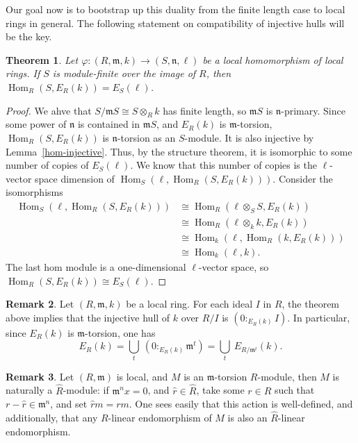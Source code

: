 \documentclass[11pt]{book}
\newtheorem{theorem}{Theorem}[chapter]
\numberwithin{equation}{section}
\numberwithin{theorem}{chapter}
\theoremstyle{definition}
\newtheorem*{basic properties}{Basic Properties}
\newtheorem*{Important Remark}{Important Remark}
\newtheorem{remark}[theorem]{Remark}
\theoremstyle{remark}
\newcommand{\m}{\mathfrak{m}}
\newcommand{\Hom}{\operatorname{Hom}}
\begin{document}
Our goal now is to bootstrap up this duality from the finite length case to local rings in general. The following statement on compatibility of injective hulls will be the key.

\begin{theorem}
	Let $\varphi \!: (R, \m, k) \longrightarrow (S, \mathfrak{n}, \ell)$ be a local homomorphism of local rings. If $S$ is module-finite over the image of $R$, then $\Hom_R(S,E_R(k)) = E_S(\ell)$.
\end{theorem}

\begin{proof} We ahve that $S/\m S \cong S \otimes_R k$ has finite length, so $\m S$ is $\mathfrak{n}$-primary. Since some power of $\mathfrak{n}$ is contained in $\m S$, and $E_R(k)$ is $\m$-torsion, $\Hom_R(S,E_R(k))$ is $\mathfrak{n}$-torsion as an $S$-module. It is also injective by Lemma~\ref{hom-injective}.
	Thus, by the structure theorem, it is isomorphic to some number of copies of $E_S(\ell)$. We know that this number of copies is the $\ell$-vector space dimension of $\Hom_S(\ell,\Hom_R(S,E_R(k)))$. Consider the isomorphisms
	\begin{align*}
	\Hom_S(\ell,\Hom_R(S,E_R(k))) & \cong \Hom_R(\ell \otimes_S S, E_R(k)) \\
	& \cong \Hom_R(\ell \otimes_k k, E_R(k)) \\
	& \cong \Hom_k(\ell, \Hom_R(k,E_R(k))) \\
	& \cong \Hom_k(\ell,k).
	\end{align*}
	The last hom module is a one-dimensional $\ell$-vector space, so $\Hom_R(S,E_R(k)) \cong E_S(\ell)$.
\end{proof}

\begin{remark}
	Let $(R,\m,k)$ be a local ring. For each ideal $I$ in $R$, the theorem above implies that the injective hull of $k$ over $R/I$ is $(0 :_{E_R(k)} I)$. In particular, since $E_R(k)$ is $\m$-torsion, one has 
	$$E_R(k) = \bigcup_{t} \ (0 :_{E_R(k)} \m^t) = \bigcup_{t} \ E_{R/\m^t}(k).$$
\end{remark}

\begin{remark}
	Let $(R,\m)$ is local, and $M$ is an $\m$-torsion $R$-module, then $M$ is naturally a $\widehat{R}$-module: if $\m^n x=0$, and $\widehat{r}\in \widehat{R}$, take some $r\in R$ such that $r-\widehat{r}\in \m^n$, and set $\widehat{r}m=rm$. One sees easily that this action is well-defined, and additionally, that any $R$-linear endomorphism of $M$ is also an $\widehat{R}$-linear endomorphism.
\end{remark}
\end{document}
